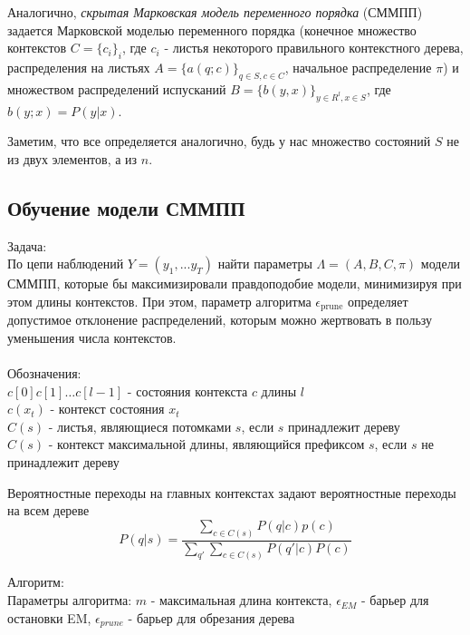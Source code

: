 \documentclass{matmex-diploma-custom}
\begin{document}
Аналогично, \textit{скрытая Марковская модель переменного порядка} (СММПП) задается Марковской моделью переменного порядка (конечное множество контекстов $ C=\{c_{i}\}_{i} $, где $ c_{i} $ - листья некоторого правильного контекстного дерева, распределения на листьях $ A = \{a(q; c)\}_{q \in S, c \in C}$, начальное распределение $ \pi $)  и множеством распределений испусканий $ B = \{b(y,x)\}_{y \in R^{l}, x \in S}$, где $ b(y; x) = P(y|x)$. 

Заметим, что все определяется аналогично, будь у нас множество состояний $ S $ не из двух элементов, а из $n$.
\subsection{Обучение модели СММПП}
{\large Задача:} 
\\
По цепи наблюдений $ Y = (y_{1}, ... y_{T}) $ найти параметры $\Lambda = (A,B,C,\pi)$ модели СММПП, которые бы максимизировали правдоподобие модели, минимизируя при этом длины контекстов. При этом, параметр алгоритма $ \epsilon_{\text{prune}} $ определяет допустимое отклонение распределений, которым можно жертвовать в пользу уменьшения числа контекстов.
\\\\
Обозначения: 
\\
$c[0]c[1]\ldots c[l-1]$ - состояния контекста $ c $ длины $ l $ 
\\
$ c(x_{t}) $ - контекст состояния $ x_{t} $ 
\\
$ C(s) $ - листья, являющиеся потомками $ s $, если $ s $ принадлежит дереву 
\\
$ C(s) $ - контекст максимальной длины, являющийся префиксом $ s $, если $ s $ не принадлежит дереву 
\begin{remark}
Вероятностные переходы на главных контекстах задают вероятностные переходы на всем дереве
$$ P(q|s) = \frac{\sum_{c \in C(s)} {P(q|c)p(c)}}{\sum_{q'}\sum_{c \in C(s)} {P(q'|c)P(c)}} $$
\label{remark:p_s}
\end{remark}
{\large Алгоритм:}
\\
Параметры алгоритма: 
$ m $ - максимальная длина контекста, 
$ \epsilon_{\textit{EM}} $ - барьер для остановки EM,
$ \epsilon_{\textit{prune}} $ - барьер для обрезания дерева
\\
\end{document}
